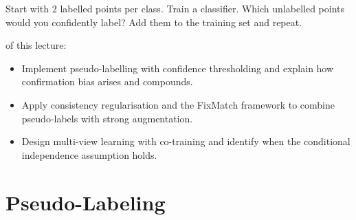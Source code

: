 \begin{marginfigure}
\caption{Few labelled points (filled), many unlabelled (hollow). Self-training expands labels iteratively.}
\label{fig:self_training_intro}
\end{marginfigure}

Start with 2 labelled points per class. Train a classifier. Which unlabelled points would you confidently label? Add them to the training set and repeat.

 of this lecture:
\begin{itemize}
    \item Implement pseudo-labelling with confidence thresholding and explain how confirmation bias arises and compounds.
    \item Apply consistency regularisation and the FixMatch framework to combine pseudo-labels with strong augmentation.
    \item Design multi-view learning with co-training and identify when the conditional independence assumption holds.
\end{itemize}


\newpage
\section{Pseudo-Labeling}

